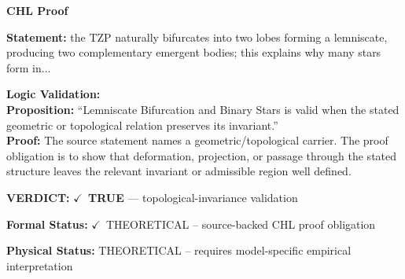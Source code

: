 \vspace{0.45em}
\noindent\textbf{CHL Proof}\par
\textbf{Statement:} the TZP naturally bifurcates into two lobes forming a lemniscate, producing two
complementary emergent bodies; this explains why many stars form in...

\textbf{Logic Validation:}\\
\textbf{Proposition:} ``Lemniscate Bifurcation and Binary Stars is valid when the stated geometric or
topological relation preserves its invariant.''\\
\textbf{Proof:} The source statement names a geometric/topological carrier. The proof obligation is to
show that deformation, projection, or passage through the stated structure leaves the
relevant invariant or admissible region well defined.

\textbf{VERDICT:} \ensuremath{\checkmark}\ \textbf{TRUE} --- topological-invariance validation

\textbf{Formal Status:} \ensuremath{\checkmark}\ THEORETICAL -- source-backed CHL proof obligation

\textbf{Physical Status:} THEORETICAL -- requires model-specific empirical interpretation
\par\vspace{0.45em}
\par
\ifTZPDarkEdition
{}
\fi
\endgroup
\endgroup
